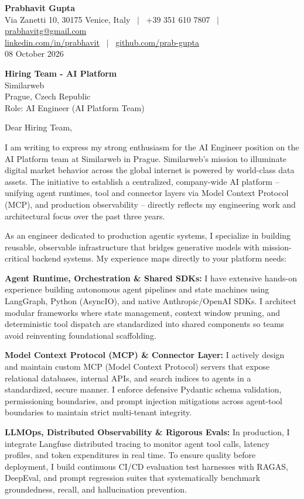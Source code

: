 \documentclass[10.5pt,a4paper]{article}
\begin{document}
\textbf{\large Prabhavit Gupta}\\
Via Zanetti 10, 30175 Venice, Italy ~$\vert$~ +39 351 610 7807 ~$\vert$~ \href{mailto:prabhavitg@gmail.com}{prabhavitg@gmail.com}\\
\href{https://www.linkedin.com/in/prabhavit/}{linkedin.com/in/prabhavit} ~$\vert$~ \href{https://github.com/prab-gupta}{github.com/prab-gupta}\\
08 October 2026

\textbf{Hiring Team - AI Platform}\\
Similarweb\\
Prague, Czech Republic\\
Role: AI Engineer (AI Platform Team)

Dear Hiring Team,

I am writing to express my strong enthusiasm for the AI Engineer position on the AI Platform team at Similarweb in Prague. Similarweb's mission to illuminate digital market behavior across the global internet is powered by world-class data assets. The initiative to establish a centralized, company-wide AI platform -- unifying agent runtimes, tool and connector layers via Model Context Protocol (MCP), and production observability -- directly reflects my engineering work and architectural focus over the past three years.

As an engineer dedicated to production agentic systems, I specialize in building reusable, observable infrastructure that bridges generative models with mission-critical backend systems. My experience maps directly to your platform needs:

\textbf{Agent Runtime, Orchestration \& Shared SDKs:} I have extensive hands-on experience building autonomous agent pipelines and state machines using LangGraph, Python (AsyncIO), and native Anthropic/OpenAI SDKs. I architect modular frameworks where state management, context window pruning, and deterministic tool dispatch are standardized into shared components so teams avoid reinventing foundational scaffolding.

\textbf{Model Context Protocol (MCP) \& Connector Layer:} I actively design and maintain custom MCP (Model Context Protocol) servers that expose relational databases, internal APIs, and search indices to agents in a standardized, secure manner. I enforce defensive Pydantic schema validation, permissioning boundaries, and prompt injection mitigations across agent-tool boundaries to maintain strict multi-tenant integrity.

\textbf{LLMOps, Distributed Observability \& Rigorous Evals:} In production, I integrate Langfuse distributed tracing to monitor agent tool calls, latency profiles, and token expenditures in real time. To ensure quality before deployment, I build continuous CI/CD evaluation test harnesses with RAGAS, DeepEval, and prompt regression suites that systematically benchmark groundedness, recall, and hallucination prevention.
\end{document}
